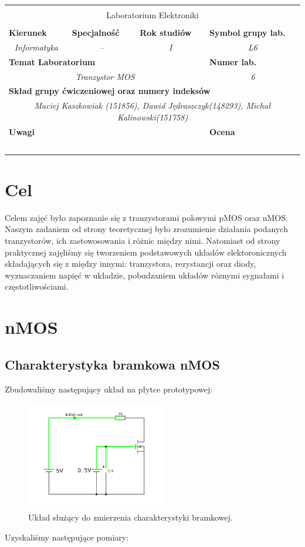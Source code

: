 \documentclass[polish,polish,a4paper]{article}
\newcommand{\PRzFieldDsc}[1]{\sffamily\bfseries\scriptsize #1}
\newcommand{\PRzFieldCnt}[1]{\textit{#1}}
\newcommand{\PRzHeading}[8]{

\begin{center}
\begin{tabular}{ p{0.32\textwidth} p{0.15\textwidth} p{0.15\textwidth} p{0.12\textwidth} p{0.12\textwidth} }

  &   &   &   &   \\
\hline
\multicolumn{5}{|c|}{}\\[-1ex]
\multicolumn{5}{|c|}{{\LARGE #1}}\\
\multicolumn{5}{|c|}{}\\[-1ex]

\hline
\multicolumn{1}{|l|}{\PRzFieldDsc{Kierunek}}    & \multicolumn{1}{|l|}{\PRzFieldDsc{Specjalność}}   & \multicolumn{1}{|l|}{\PRzFieldDsc{Rok studiów}}   & \multicolumn{2}{|l|}{\PRzFieldDsc{Symbol grupy lab.}} \\
\multicolumn{1}{|c|}{\PRzFieldCnt{#2}}      & \multicolumn{1}{|c|}{\PRzFieldCnt{#3}}        & \multicolumn{1}{|c|}{\PRzFieldCnt{#4}}        & \multicolumn{2}{|c|}{\PRzFieldCnt{#5}} \\

\hline
\multicolumn{4}{|l|}{\PRzFieldDsc{Temat Laboratorium}}      & \multicolumn{1}{|l|}{\PRzFieldDsc{Numer lab.}} \\
\multicolumn{4}{|c|}{\PRzFieldCnt{#6}}              & \multicolumn{1}{|c|}{\PRzFieldCnt{#7}} \\

\hline
\multicolumn{5}{|l|}{\PRzFieldDsc{Skład grupy ćwiczeniowej oraz numery indeksów}}\\
\multicolumn{5}{|c|}{\PRzFieldCnt{#8}}\\

\hline
\multicolumn{3}{|l|}{\PRzFieldDsc{Uwagi}}   & \multicolumn{2}{|l|}{\PRzFieldDsc{Ocena}} \\
\multicolumn{3}{|c|}{\PRzFieldCnt{\ }}      & \multicolumn{2}{|c|}{\PRzFieldCnt{\ }} \\

\hline
\end{tabular}
\end{center}
}
\begin{document}
\PRzHeading{Laboratorium Elektroniki}{Informatyka}{--}{I}{L6}{Tranzystor MOS}{6}{Maciej Kaszkowiak (151856), Dawid Jędraszczyk(148293), Michał Kalinowski(151758)}{}

\section{Cel}

Celem zajęć było zapoznanie się z tranzystorami polowymi pMOS oraz nMOS. Naszym zadaniem od strony teoretycznej było zrozumienie działania podanych tranzystorów, ich zastowosowania i różnic między nimi. Natomiast od strony praktycznej zajęliśmy się tworzeniem podstawowych układów elektoronicznych składających się z między innymi: tranzystora, rezystancji oraz diody, wyznaczaniem napięć w układzie, pobudzaniem układów róznymi sygnałami i częstotliwościami.


\section{nMOS}

\subsection{Charakterystyka bramkowa nMOS}

Zbudowaliśmy następujący układ na płytce prototypowej:
\begin{figure}[H]
\centering
\includegraphics[width=0.55\textwidth]{nmos bramkowa.pdf}
\caption{Układ służący do zmierzenia charakterystyki bramkowej.}
\end{figure}



Uzyskaliśmy następujące pomiary:
\end{document}
